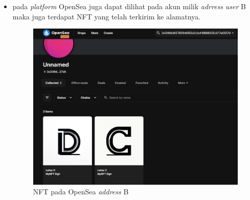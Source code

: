 \begin{itemize}
    \item pada \emph{platform} OpenSea juga dapat dilihat pada akun milik \emph{adrress} \emph{user} B maka juga terdapat NFT yang telah terkirim ke alamatnya.

    \begin{figure} [H] \centering
    \includegraphics[scale=0.27]{gambar/nft_pada_opensea_2.jpeg}
    \caption{NFT pada OpenSea \emph{address} B}
    \label{fig:opensea2}
    \end{figure}
    
\end{itemize}

